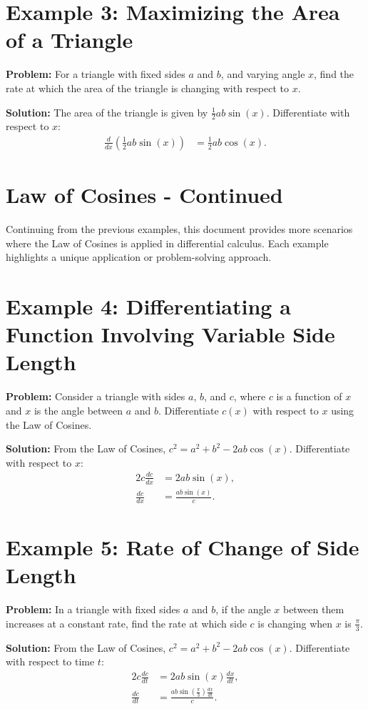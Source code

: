 \documentclass[a4paper,12pt]{book}
\newcounter{problem}
\newcounter{example}
\begin{document}
\section*{Example 3: Maximizing the Area of a Triangle}
\textbf{Problem:} For a triangle with fixed sides $a$ and $b$, and varying angle $x$, find the rate at which the area of the triangle is changing with respect to $x$.

\textbf{Solution:}
The area of the triangle is given by $\frac{1}{2}ab\sin(x)$. Differentiate with respect to $x$:
\begin{align*}
\frac{d}{dx}\left(\frac{1}{2}ab\sin(x)\right) &= \frac{1}{2}ab\cos(x).
\end{align*}

\section*{Law of Cosines - Continued}
Continuing from the previous examples, this document provides more scenarios where the Law of Cosines is applied in differential calculus. Each example highlights a unique application or problem-solving approach.

\section*{Example 4: Differentiating a Function Involving Variable Side Length}
\textbf{Problem:} Consider a triangle with sides $a$, $b$, and $c$, where $c$ is a function of $x$ and $x$ is the angle between $a$ and $b$. Differentiate $c(x)$ with respect to $x$ using the Law of Cosines.

\textbf{Solution:}
From the Law of Cosines, $c^2 = a^2 + b^2 - 2ab \cos(x)$. Differentiate with respect to $x$:
\begin{align*}
2c \frac{dc}{dx} &= 2ab \sin(x), \\
\frac{dc}{dx} &= \frac{ab \sin(x)}{c}.
\end{align*}

\section*{Example 5: Rate of Change of Side Length}
\textbf{Problem:} In a triangle with fixed sides $a$ and $b$, if the angle $x$ between them increases at a constant rate, find the rate at which side $c$ is changing when $x$ is $\frac{\pi}{3}$.

\textbf{Solution:}
From the Law of Cosines, $c^2 = a^2 + b^2 - 2ab \cos(x)$. Differentiate with respect to time $t$:
\begin{align*}
2c \frac{dc}{dt} &= 2ab \sin(x) \frac{dx}{dt}, \\
\frac{dc}{dt} &= \frac{ab \sin\left(\frac{\pi}{3}\right) \frac{dx}{dt}}{c}.
\end{align*}
\end{document}
